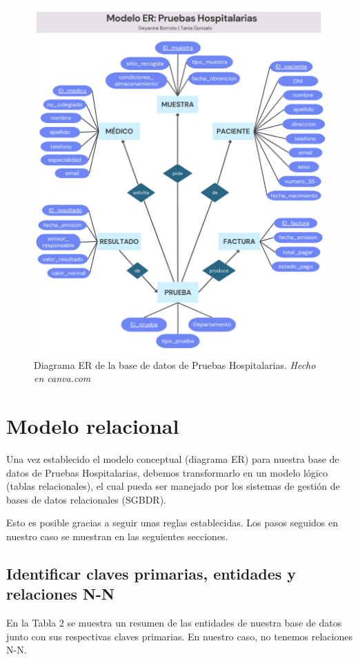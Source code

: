 \documentclass[spanish]{article}
\begin{document}
\begin{figure}[!htbp]
    \centering
    \includegraphics[width=150mm,scale=1.5]{Diagramas/diagramaER1.png}
    \caption{Diagrama ER de la base de datos de Pruebas Hospitalarias. \textit{Hecho en canva.com}}
    \label{fig:diagrama_er}
\end{figure}

\newpage
\section{Modelo relacional}
Una vez establecido el modelo conceptual (diagrama ER) para nuestra base de datos de Pruebas Hospitalarias, debemos transformarlo en un modelo lógico (tablas relacionales), el cual pueda ser manejado por los sistemas de gestión de bases de datos relacionales (SGBDR).

Esto es posible gracias a seguir unas reglas establecidas. Los pasos seguidos en nuestro caso se muestran en las seguientes secciones.

\subsection{Identificar claves primarias, entidades y relaciones N-N}
En la Tabla 2 se muestra un resumen de las entidades de nuestra base de datos junto con sus respectivas claves primarias. En nuestro caso, no tenemos relaciones N-N.
\end{document}
